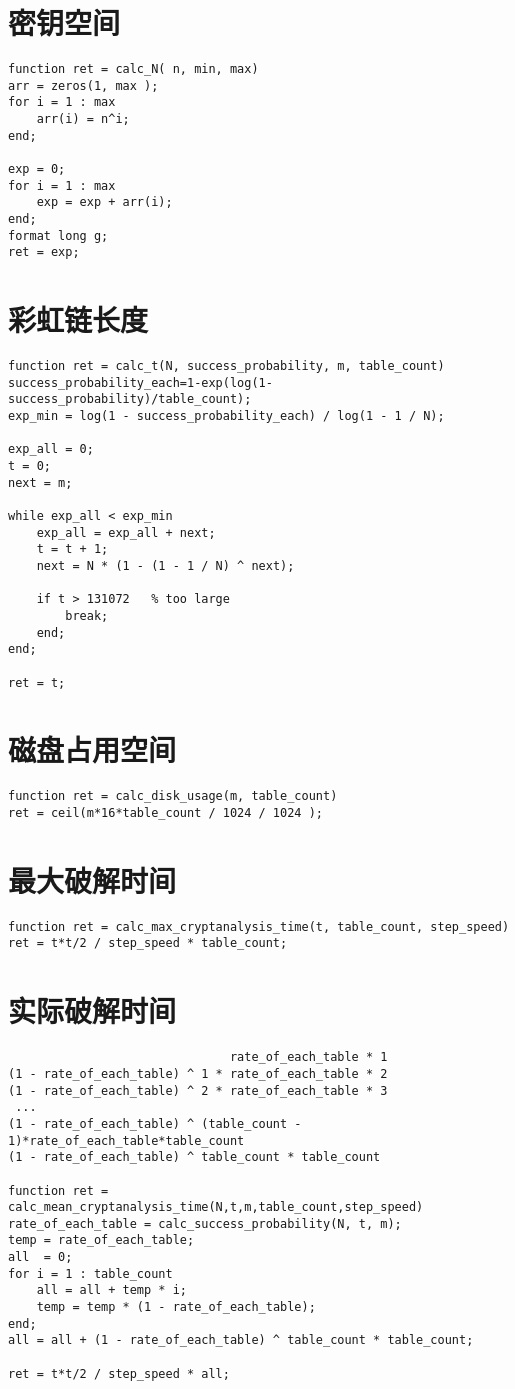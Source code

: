 \section{密钥空间}
\begin{lstlisting}
function ret = calc_N( n, min, max)
arr = zeros(1, max );
for i = 1 : max
	arr(i) = n^i;
end;

exp = 0;
for i = 1 : max
	exp = exp + arr(i);
end;
format long g;
ret = exp;
\end{lstlisting}
\section{彩虹链长度}
\begin{lstlisting}
function ret = calc_t(N, success_probability, m, table_count)
success_probability_each=1-exp(log(1-success_probability)/table_count);
exp_min = log(1 - success_probability_each) / log(1 - 1 / N);

exp_all = 0;
t = 0;
next = m;

while exp_all < exp_min
	exp_all = exp_all + next;
	t = t + 1;
	next = N * (1 - (1 - 1 / N) ^ next);

	if t > 131072	% too large
		break;
	end;
end;

ret = t;
\end{lstlisting}
\section{磁盘占用空间}
\begin{lstlisting}
function ret = calc_disk_usage(m, table_count)
ret = ceil(m*16*table_count / 1024 / 1024 );
\end{lstlisting}
\section{最大破解时间}
\begin{lstlisting}
function ret = calc_max_cryptanalysis_time(t, table_count, step_speed)
ret = t*t/2 / step_speed * table_count;
\end{lstlisting}
\section{实际破解时间}
\begin{lstlisting}
                               rate_of_each_table * 1 
(1 - rate_of_each_table) ^ 1 * rate_of_each_table * 2 
(1 - rate_of_each_table) ^ 2 * rate_of_each_table * 3
 ...
(1 - rate_of_each_table) ^ (table_count - 1)*rate_of_each_table*table_count
(1 - rate_of_each_table) ^ table_count * table_count

function ret = calc_mean_cryptanalysis_time(N,t,m,table_count,step_speed)
rate_of_each_table = calc_success_probability(N, t, m);
temp = rate_of_each_table;
all  = 0;
for i = 1 : table_count
    all = all + temp * i;
    temp = temp * (1 - rate_of_each_table);
end;
all = all + (1 - rate_of_each_table) ^ table_count * table_count;

ret = t*t/2 / step_speed * all;
\end{lstlisting}
